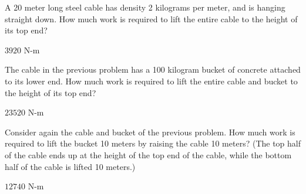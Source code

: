 \begin{exercises}
\exercise A 20 meter long steel cable has density 2 kilograms per
meter, and is hanging straight down. How much work is required to lift
the entire cable to the height of its top end?
\begin{answer} $3920$ N-m
\end{answer}

\exercise The cable in the previous problem has a 100 kilogram bucket
of concrete attached to its lower end. How much work is required to lift
the entire cable and bucket to the height of its top end?
\begin{answer} $23520$ N-m
\end{answer}

\exercise Consider again the cable and bucket of the previous problem.
How much work is required to lift the bucket 10 meters by raising the
cable 10 meters? (The top half of the cable ends up at the height of
the top end of the cable, while the bottom half of the cable is lifted
10 meters.)
\begin{answer} $12740$ N-m
\end{answer}

\end{exercises}

